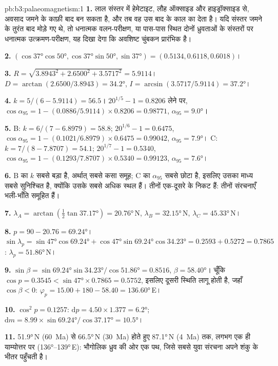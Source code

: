 \begin{solution}{pb:b3:palaeomagnetism:1}
\textbf{1.} लाल संस्तर में हेमेटाइट, लौह ऑक्साइड और हाइड्रॉक्साइड से,
अवसाद जमने के काफ़ी बाद बन सकता है, और तब वह उस बाद के काल का  देता है।
यदि संस्तर जमने के तुरंत बाद मोड़े गए थे, तो धनात्मक वलन-परीक्षण,
या पास-पास स्थित दोनों ध्रुवताओं के संस्तरों पर धनात्मक उत्क्रमण-परीक्षण,
यह दिखा देगा कि अवशिष्ट चुंबकन प्रारंभिक है।

\textbf{2.} $(\cos\ang{37}\cos\ang{50}, \cos\ang{37}\sin\ang{50}, \sin\ang{37})
= (0.5134, 0.6118, 0.6018)$।

\textbf{3.} $R = \sqrt{3.8943^2 + 2.6500^2 + 3.5717^2} = 5.9114$। $D =
\arctan(2.6500/3.8943) = \ang{34.2}$, $I = \arcsin(3.5717/5.9114) = \ang{37.2}$।

\textbf{4.} $k = 5/(6 - 5.9114) = 56.5$। $20^{1/5} - 1 = 0.8206$ लेने पर,
$\cos\alpha_{95} = 1 - (0.0886/5.9114)\times0.8206 = 0.98771$, $\alpha_{95} =
\ang{9.0}$।

\textbf{5.} B: $k = 6/(7 - 6.8979) = 58.8$; $20^{1/6} - 1 = 0.6475$,
$\cos\alpha_{95} = 1 - (0.1021/6.8979)\times0.6475 = 0.99042$, $\alpha_{95} =
\ang{7.9}$। C: $k = 7/(8 - 7.8707) = 54.1$; $20^{1/7} - 1 = 0.5340$,
$\cos\alpha_{95} = 1 - (0.1293/7.8707)\times0.5340 = 0.99123$, $\alpha_{95} =
\ang{7.6}$।

\textbf{6.} B का $k$ सबसे बड़ा है, अर्थात् सबसे कसा समूह; C का
$\alpha_{95}$ सबसे छोटा है, इसलिए उसका माध्य सबसे सुनिश्चित है, क्योंकि उसके सबसे अधिक स्थल हैं।
तीनों एक-दूसरे के निकट हैं: तीनों संरचनाएँ भली-भाँति समूहित हैं।

\textbf{7.} $\lambda_A = \arctan(\tfrac12\tan\ang{37.17}) = \ang{20.76}$\,N,
$\lambda_B = \ang{32.15}$\,N, $\lambda_C = \ang{45.33}$\,N।

\textbf{8.} $p = 90 - 20.76 = \ang{69.24}$। $\sin\lambda_p =
\sin\ang{47}\cos\ang{69.24} + \cos\ang{47}\sin\ang{69.24}\cos\ang{34.23} =
0.2593 + 0.5272 = 0.7865$: $\lambda_p = \ang{51.86}$\,N।

\textbf{9.} $\sin\beta = \sin\ang{69.24}\sin\ang{34.23}/\cos\ang{51.86} =
0.8516$, $\beta = \ang{58.40}$। चूँकि $\cos p = 0.3545 < \sin\ang{47}\times
0.7865 = 0.5752$, इसलिए दूसरी स्थिति लागू होती है, जहाँ $\cos\beta < 0$:
$\varphi_p = 15.00 + 180 - 58.40 = \ang{136.60}$\,E।

\textbf{10.} $\cos^2p = 0.1257$: $\mathrm dp = 4.50\times1.377 = \ang{6.2}$;
$\mathrm dm = 8.99\times\sin\ang{69.24}/\cos\ang{37.17} = \ang{10.5}$।

\textbf{11.} \ang{51.9}\,N (\qty{60}{Ma}) से \ang{66.5}\,N (\qty{30}{Ma}) होते हुए
\ang{87.1}\,N (\qty{4}{Ma}) तक, लगभग एक ही याम्योत्तर पर
(\ang{136}--\ang{139}\,E): भौगोलिक ध्रुव की ओर एक पथ, जिसे
सबसे युवा संरचना अपने शंकु के भीतर पहुँचती है।


\end{solution}
